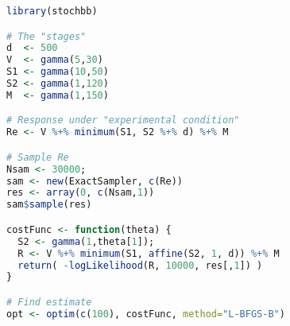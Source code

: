 \begin{lstlisting}[language=R]
library(stochbb)

# The "stages"
d  <- 500
V  <- gamma(5,30)
S1 <- gamma(10,50)
S2 <- gamma(1,120)
M  <- gamma(1,150) 

# Response under "experimental condition"
Re <- V %+% minimum(S1, S2 %+% d) %+% M

# Sample Re
Nsam <- 30000;
sam <- new(ExactSampler, c(Re))
res <- array(0, c(Nsam,1))
sam$sample(res)

costFunc <- function(theta) {
  S2 <- gamma(1,theta[1]);
  R <- V %+% minimum(S1, affine(S2, 1, d)) %+% M
  return( -logLikelihood(R, 10000, res[,1]) )
}

# Find estimate
opt <- optim(c(100), costFunc, method="L-BFGS-B")
\end{lstlisting}